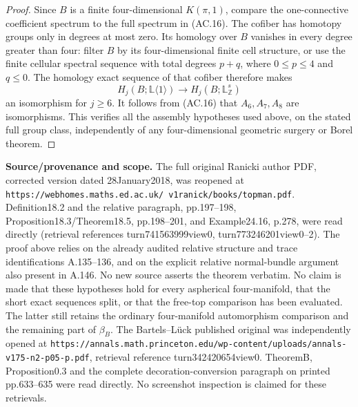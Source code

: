 \begin{proof}
Since $B$ is a finite four-dimensional $K(\pi,1)$, compare the
one-connective coefficient spectrum to the full spectrum in (AC.16).
The cofiber has homotopy groups only in degrees at most zero.
Its homology over $B$ vanishes in every degree greater than four:
filter $B$ by its four-dimensional finite cell structure, or use the
finite cellular spectral sequence with total degrees $p+q$, where
$0\le p\le4$ and $q\le0$. The homology exact sequence of that
cofiber therefore makes
\[
 H_j(B;\mathbb L\langle1\rangle)
             \longrightarrow H_j(B;\mathbb L^s_{\mathbb Z})
\]
an isomorphism for $j\ge6$. It follows from (AC.16) that $A_6,A_7,A_8$
are isomorphisms. This verifies all the assembly hypotheses used
above, on the stated full group class, independently of any
four-dimensional geometric surgery or Borel theorem.
\end{proof}

\textbf{Source/provenance and scope.}
The full original Ranicki author PDF, corrected version dated
28January2018, was reopened at
\texttt{https://webhomes.maths.ed.ac.uk/\string~v1ranick/books/topman.pdf}.
Definition18.2 and the relative paragraph, pp.197--198,
Proposition18.3/Theorem18.5, pp.198--201, and Example24.16, p.278,
were read directly (retrieval references turn741563999view0,
turn773246201view0--2). The proof above relies on the already audited
relative structure and trace identifications A.135--136, and on the
explicit relative normal-bundle argument also present in A.146.
No new source asserts the theorem verbatim. No claim is made that
these hypotheses hold for every aspherical four-manifold, that the
short exact sequences split, or that the free-top comparison has
been evaluated. The latter still retains the ordinary
four-manifold automorphism comparison and the remaining part of
$\beta_B$.
The Bartels--L\"uck published original was independently opened at
\texttt{https://annals.math.princeton.edu/wp-content/uploads/annals-v175-n2-p05-p.pdf},
retrieval reference turn342420654view0. TheoremB, Proposition0.3 and
the complete decoration-conversion paragraph on printed pp.633--635
were read directly. No screenshot inspection is claimed for these
retrievals.
